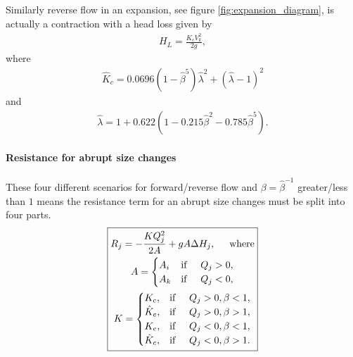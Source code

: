 Similarly reverse flow in an expansion, see figure \ref{fig:expansion_diagram}, is actually a contraction with a head loss given by
\begin{align}
H_L = \frac{\hat{K}_c V_k^2}{2g},
\end{align}
where 
\begin{align*}
\hat{K}_c = 0.0696 \left( 1 - \hat{\beta}^5 \right) \hat{\lambda}^2 + \left( \hat{\lambda} - 1 \right)^2
\end{align*}
and
\begin{align*}
\hat{\lambda} = 1 + 0.622 \left( 1 - 0.215 \hat{\beta}^2 - 0.785 \hat{\beta}^5 \right).
\end{align*}

\paragraph{Resistance for abrupt size changes}

These four different scenarios for forward/reverse flow and $\beta = \hat{\beta}^{-1}$ greater/less than $1$ means the resistance term for an abrupt size changes must be split into four parts. 
\begin{align}\label{abrupt_size_change_resistance}
\boxed{
  \!\begin{gathered}
  R_j = -\frac{K Q_j^2}{2 A} + g A \Delta H_j, \hspace{0.5cm} \text{where} \\
A = \begin{cases}
A_i &\text{if} \hspace{0.5cm} Q_j > 0,\\
A_k &\text{if} \hspace{0.5cm} Q_j < 0,
\end{cases} \nonumber \\
K = \begin{cases} 
K_c, &\text{if} \hspace{0.5cm} Q_j > 0, \beta < 1, \\
\hat{K}_e, &\text{if} \hspace{0.5cm} Q_j > 0, \beta > 1, \\
K_e, &\text{if} \hspace{0.5cm} Q_j < 0, \beta < 1, \\
\hat{K}_c, &\text{if} \hspace{0.5cm} Q_j < 0, \beta > 1.
\end{cases} \nonumber
  \end{gathered}
}
\end{align}